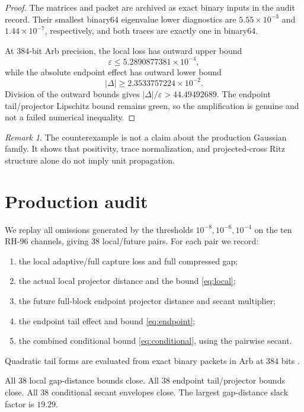 \documentclass[11pt]{article}
\theoremstyle{definition}
\theoremstyle{remark}
\newtheorem{remark}[theorem]{Remark}
\begin{document}
\begin{proof}
The matrices and packet are archived as exact binary inputs in the audit
record.  Their smallest binary64 eigenvalue lower diagnostics are
$5.55\times10^{-3}$ and $1.44\times10^{-7}$, respectively, and both traces
are exactly one in binary64.

At 384-bit Arb precision, the local loss has outward upper bound
\[
 \varepsilon\le5.2890877381\times10^{-4},
\]
while the absolute endpoint effect has outward lower bound
\[
 |\Delta|\ge2.3533757224\times10^{-2}.
\]
Division of the outward bounds gives
$|\Delta|/\varepsilon>44.49492689$.  The endpoint
tail/projector Lipschitz bound remains green, so the amplification is genuine
and not a failed numerical inequality.
\end{proof}

\begin{remark}
The counterexample is not a claim about the production Gaussian family.  It
shows that positivity, trace normalization, and projected-cross Ritz
structure alone do not imply unit propagation.
\end{remark}

\section{Production audit}
\label{sec:audit}

We replay all omissions generated by the thresholds
$10^{-8},10^{-6},10^{-4}$ on the ten RH-96 channels, giving 38 local/future
pairs.  For each pair we record:
\begin{enumerate}[leftmargin=2em]
\item the local adaptive/full capture loss and full compressed gap;
\item the actual local projector distance and the bound
\eqref{eq:local};
\item the future full-block endpoint projector distance and secant multiplier;
\item the endpoint tail effect and bound \eqref{eq:endpoint};
\item the combined conditional bound \eqref{eq:conditional}, using the
pairwise secant.
\end{enumerate}
Quadratic tail forms are evaluated from exact binary packets in Arb at 384
bits \citep{Rump2010}.

All 38 local gap-distance bounds close.  All 38 endpoint
tail/projector bounds close.  All 38 conditional secant envelopes close.
The largest gap-distance slack factor is $19.29$.
\end{document}
